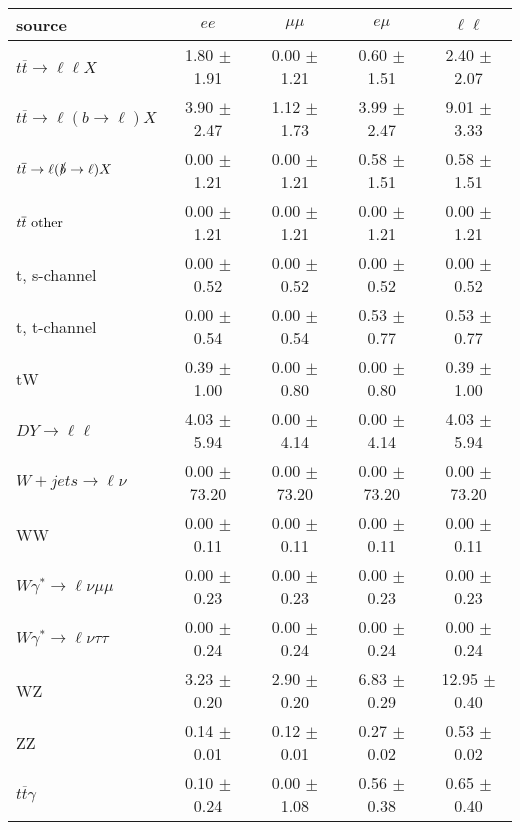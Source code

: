 \begin{tabular}{l|cccc} \hline\hline
source & $ee$ & $\mu\mu$ & $e\mu$ & $\ell\ell $ \\
\hline
$t\overline{t} \rightarrow \ell \ell X$ &  1.80 $\pm$  1.91 &  0.00 $\pm$  1.21 &  0.60 $\pm$  1.51 &  2.40 $\pm$  2.07 \\
$t\overline{t} \rightarrow \ell (b \rightarrow \ell) X$ &  3.90 $\pm$  2.47 &  1.12 $\pm$  1.73 &  3.99 $\pm$  2.47 &  9.01 $\pm$  3.33 \\
$t\overline{t} \rightarrow \ell (\slashed b \rightarrow \ell) X$ &  0.00 $\pm$  1.21 &  0.00 $\pm$  1.21 &  0.58 $\pm$  1.51 &  0.58 $\pm$  1.51 \\
        $t\overline{t}\ \rm{other}$ &  0.00 $\pm$  1.21 &  0.00 $\pm$  1.21 &  0.00 $\pm$  1.21 &  0.00 $\pm$  1.21 \\
\hline
                       t, s-channel &  0.00 $\pm$  0.52 &  0.00 $\pm$  0.52 &  0.00 $\pm$  0.52 &  0.00 $\pm$  0.52 \\
                       t, t-channel &  0.00 $\pm$  0.54 &  0.00 $\pm$  0.54 &  0.53 $\pm$  0.77 &  0.53 $\pm$  0.77 \\
                                 tW &  0.39 $\pm$  1.00 &  0.00 $\pm$  0.80 &  0.00 $\pm$  0.80 &  0.39 $\pm$  1.00 \\
\hline
         $DY \rightarrow \ell \ell$ &  4.03 $\pm$  5.94 &  0.00 $\pm$  4.14 &  0.00 $\pm$  4.14 &  4.03 $\pm$  5.94 \\
      $W+jets \rightarrow \ell \nu$ &  0.00 $\pm$ 73.20 &  0.00 $\pm$ 73.20 &  0.00 $\pm$ 73.20 &  0.00 $\pm$ 73.20 \\
                                 WW &  0.00 $\pm$  0.11 &  0.00 $\pm$  0.11 &  0.00 $\pm$  0.11 &  0.00 $\pm$  0.11 \\
\hline
$W\gamma^{*} \rightarrow \ell \nu \mu\mu$ &  0.00 $\pm$  0.23 &  0.00 $\pm$  0.23 &  0.00 $\pm$  0.23 &  0.00 $\pm$  0.23 \\
$W\gamma^{*} \rightarrow \ell \nu \tau\tau$ &  0.00 $\pm$  0.24 &  0.00 $\pm$  0.24 &  0.00 $\pm$  0.24 &  0.00 $\pm$  0.24 \\
                                 WZ &  3.23 $\pm$  0.20 &  2.90 $\pm$  0.20 &  6.83 $\pm$  0.29 & 12.95 $\pm$  0.40 \\
                                 ZZ &  0.14 $\pm$  0.01 &  0.12 $\pm$  0.01 &  0.27 $\pm$  0.02 &  0.53 $\pm$  0.02 \\
\hline
              $t\overline{t}\gamma$ &  0.10 $\pm$  0.24 &  0.00 $\pm$  1.08 &  0.56 $\pm$  0.38 &  0.65 $\pm$  0.40 \\

\end{tabular}
